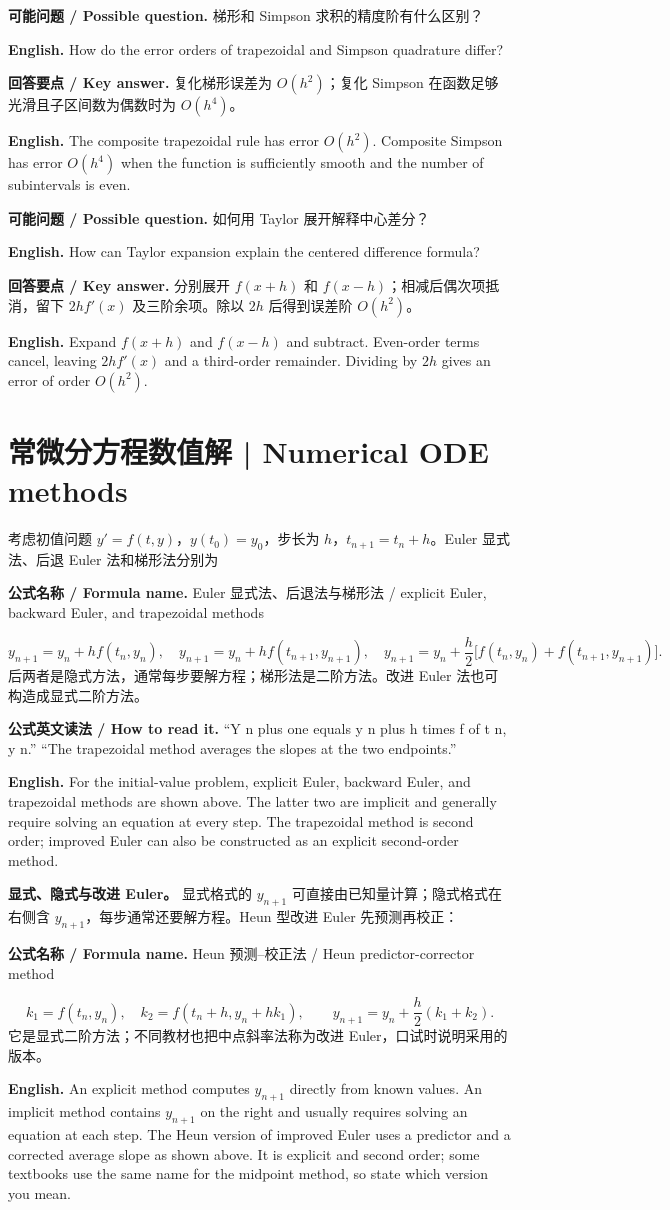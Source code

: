 \documentclass[UTF8,11pt,a4paper]{ctexart}
\newcommand{\EN}[1]{\par\noindent\textbf{English.} #1\par}
\newcommand{\READ}[1]{\par\noindent\textbf{公式英文读法 / How to read it.} #1\par}
\newcommand{\FORMULA}[2]{\par\noindent\textbf{公式名称 / Formula name.} #1 / #2\par}
\newcommand{\ASK}[4]{\par\noindent\textbf{可能问题 / Possible question.} #1\par\EN{#2}\noindent\textbf{回答要点 / Key answer.} #3\par\EN{#4}\medskip}
\begin{document}
\ASK{梯形和 Simpson 求积的精度阶有什么区别？}{How do the error orders of trapezoidal and Simpson quadrature differ?}{复化梯形误差为 $O(h^2)$；复化 Simpson 在函数足够光滑且子区间数为偶数时为 $O(h^4)$。}{The composite trapezoidal rule has error $O(h^2)$. Composite Simpson has error $O(h^4)$ when the function is sufficiently smooth and the number of subintervals is even.}

\ASK{如何用 Taylor 展开解释中心差分？}{How can Taylor expansion explain the centered difference formula?}{分别展开 $f(x+h)$ 和 $f(x-h)$；相减后偶次项抵消，留下 $2hf'(x)$ 及三阶余项。除以 $2h$ 后得到误差阶 $O(h^2)$。}{Expand $f(x+h)$ and $f(x-h)$ and subtract. Even-order terms cancel, leaving $2hf'(x)$ and a third-order remainder. Dividing by $2h$ gives an error of order $O(h^2)$.}

\section{常微分方程数值解 | Numerical ODE methods}
考虑初值问题 $y'=f(t,y)$，$y(t_0)=y_0$，步长为 $h$，$t_{n+1}=t_n+h$。Euler 显式法、后退 Euler 法和梯形法分别为
\FORMULA{Euler 显式法、后退法与梯形法}{explicit Euler, backward Euler, and trapezoidal methods}
\[
y_{n+1}=y_n+hf(t_n,y_n),\quad
y_{n+1}=y_n+hf(t_{n+1},y_{n+1}),\quad
y_{n+1}=y_n+\frac h2\big[f(t_n,y_n)+f(t_{n+1},y_{n+1})\big].
\]
后两者是隐式方法，通常每步要解方程；梯形法是二阶方法。改进 Euler 法也可构造成显式二阶方法。
\READ{“Y n plus one equals y n plus h times f of t n, y n.” “The trapezoidal method averages the slopes at the two endpoints.”}
\EN{For the initial-value problem, explicit Euler, backward Euler, and trapezoidal methods are shown above. The latter two are implicit and generally require solving an equation at every step. The trapezoidal method is second order; improved Euler can also be constructed as an explicit second-order method.}

\noindent\textbf{显式、隐式与改进 Euler。} 显式格式的 $y_{n+1}$ 可直接由已知量计算；隐式格式在右侧含 $y_{n+1}$，每步通常还要解方程。Heun 型改进 Euler 先预测再校正：
\FORMULA{Heun 预测--校正法}{Heun predictor-corrector method}
\[
k_1=f(t_n,y_n),\quad k_2=f(t_n+h,y_n+hk_1),\qquad
y_{n+1}=y_n+\frac h2(k_1+k_2).
\]
它是显式二阶方法；不同教材也把中点斜率法称为改进 Euler，口试时说明采用的版本。
\EN{An explicit method computes $y_{n+1}$ directly from known values. An implicit method contains $y_{n+1}$ on the right and usually requires solving an equation at each step. The Heun version of improved Euler uses a predictor and a corrected average slope as shown above. It is explicit and second order; some textbooks use the same name for the midpoint method, so state which version you mean.}
\end{document}
